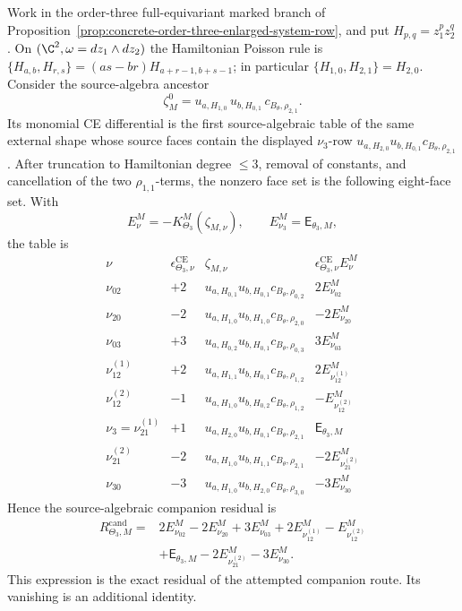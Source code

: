 \begin{thm}\label{thm:theta-three-companion-face-obstruction}
  Work in the order-three full-equivariant marked branch of
  Proposition~\ref{prop:concrete-order-three-enlarged-system-row}, and put
  \(H_{p,q}=z_1^pz_2^q\).  On
  \((\C^2,\omega=dz_1\wedge dz_2)\) the Hamiltonian Poisson rule
  is
  \(\{H_{a,b},H_{r,s}\}=(as-br)H_{a+r-1,b+s-1}\); in particular
  \(\{H_{1,0},H_{2,1}\}=H_{2,0}\).  Consider the source-algebra ancestor
  \[
    \zeta^0_M=u_{a,H_{1,0}}\,u_{b,H_{0,1}}\,c_{B_\theta,\rho_{2,1}}.
  \]
  Its monomial CE differential is the first source-algebraic table of the
  same external shape whose source faces contain the displayed
  \(\nu_3\)-row
  \(u_{a,H_{2,0}}u_{b,H_{0,1}}c_{B_\theta,\rho_{2,1}}\).  After truncation
  to Hamiltonian degree \(\leq3\), removal of constants, and cancellation of
  the two \(\rho_{1,1}\)-terms, the nonzero face set is the
  following eight-face set.  With
  \[
    E^M_\nu=-K^M_{\Theta_3}(\zeta_{M,\nu}),
    \qquad
    E^M_{\nu_3}=\mathsf E_{\theta_3,M},
  \]
  the table is
  \[
  \begin{array}{c|c|l|l}
    \nu & \epsilon^{\mathrm{CE}}_{\Theta_3,\nu}
      & \zeta_{M,\nu} & \epsilon^{\mathrm{CE}}_{\Theta_3,\nu}E^M_\nu \\
    \hline
    \nu_{02} & +2
      & u_{a,H_{0,1}}u_{b,H_{0,1}}c_{B_\theta,\rho_{0,2}}
      & 2E^M_{\nu_{02}} \\
    \nu_{20} & -2
      & u_{a,H_{1,0}}u_{b,H_{1,0}}c_{B_\theta,\rho_{2,0}}
      & -2E^M_{\nu_{20}} \\
    \nu_{03} & +3
      & u_{a,H_{0,2}}u_{b,H_{0,1}}c_{B_\theta,\rho_{0,3}}
      & 3E^M_{\nu_{03}} \\
    \nu_{12}^{(1)} & +2
      & u_{a,H_{1,1}}u_{b,H_{0,1}}c_{B_\theta,\rho_{1,2}}
      & 2E^M_{\nu_{12}^{(1)}} \\
    \nu_{12}^{(2)} & -1
      & u_{a,H_{1,0}}u_{b,H_{0,2}}c_{B_\theta,\rho_{1,2}}
      & -E^M_{\nu_{12}^{(2)}} \\
    \nu_3=\nu_{21}^{(1)} & +1
      & u_{a,H_{2,0}}u_{b,H_{0,1}}c_{B_\theta,\rho_{2,1}}
      & \mathsf E_{\theta_3,M} \\
    \nu_{21}^{(2)} & -2
      & u_{a,H_{1,0}}u_{b,H_{1,1}}c_{B_\theta,\rho_{2,1}}
      & -2E^M_{\nu_{21}^{(2)}} \\
    \nu_{30} & -3
      & u_{a,H_{1,0}}u_{b,H_{2,0}}c_{B_\theta,\rho_{3,0}}
      & -3E^M_{\nu_{30}}
  \end{array}
  \]
  Hence the source-algebraic companion residual is
  \[
  \begin{aligned}
    R^{\mathrm{cand}}_{\Theta_3,M}
      ={}&2E^M_{\nu_{02}}-2E^M_{\nu_{20}}
          +3E^M_{\nu_{03}}+2E^M_{\nu_{12}^{(1)}}
          -E^M_{\nu_{12}^{(2)}}\\
       &+\mathsf E_{\theta_3,M}
          -2E^M_{\nu_{21}^{(2)}}-3E^M_{\nu_{30}} .
  \end{aligned}
  \]
  This expression is the exact residual of the attempted companion route.
  Its vanishing is an additional identity.


\end{thm}
